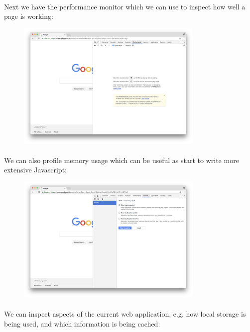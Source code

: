 \documentclass[12pt, a4paper, oneside]{book}
\begin{document}
\paragraph{} Next we have the performance monitor which we can use to inspect how well a page is working:

\begin{figure}[H]
\centering
\includegraphics[width=0.8\textwidth]{figures/devtools-performance.png}
\label{fig:devtools-performance}
\end{figure}

\paragraph{} We can also profile memory usage which can be useful as start to write more extensive Javascript:

\begin{figure}[H]
\centering
\includegraphics[width=0.8\textwidth]{figures/devtools-memory.png}
\label{fig:devtools-memory}
\end{figure}


\paragraph{} We can inspect aspects of the current web application, e.g. how local storage is being used, and which information is being cached:
\end{document}

